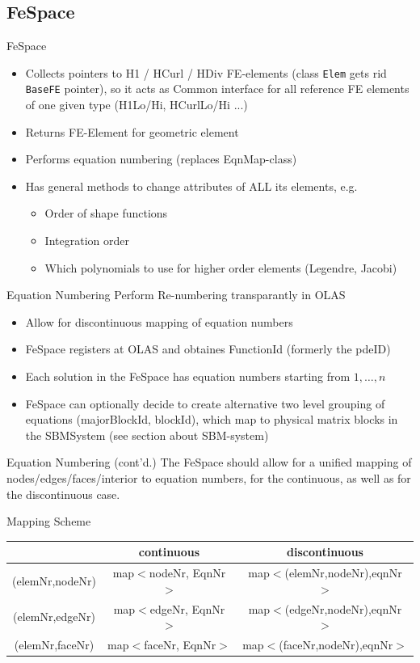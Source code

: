 \documentclass[10pt]{beamer}
\begin{document}
\subsection{FeSpace}
\begin{frame}[fragile]{FeSpace}
\begin{itemize} 
\item Collects pointers to H1 / HCurl / HDiv FE-elements (class \verb#Elem# gets rid \verb#BaseFE# pointer), so it acts as {\color{red} Common interface for all reference FE elements of one given type (H1Lo/Hi, HCurlLo/Hi ...)}
\item Returns FE-Element for geometric element
\item Performs equation numbering (replaces EqnMap-class)
\item Has general methods to change attributes of ALL its elements, e.g.
\begin{itemize}
\item Order of shape functions
\item Integration order
\item Which polynomials to use for higher order elements (Legendre, Jacobi)
\end{itemize}
\end{itemize}
\end{frame}

\begin{frame}[fragile]{Equation Numbering}
Perform Re-numbering transparantly in OLAS 
\begin{itemize}
  \item Allow for discontinuous mapping of equation numbers
  \item FeSpace registers at OLAS and obtaines FunctionId (formerly the pdeID)
  \item Each solution in the FeSpace has equation numbers starting from $1,\dots,n$
  \item FeSpace can optionally decide to create alternative two level grouping of equations (majorBlockId, blockId), which map to physical matrix blocks in the SBMSystem (see section about SBM-system)
 \end{itemize}
\end{frame}


\begin{frame}{Equation Numbering (cont'd.)}
The FeSpace should allow for a unified mapping of nodes/edges/faces/interior to equation numbers, for the continuous, as well as for the discontinuous case.
\begin{block}{Mapping Scheme}
\begin{tabular}{c|c|c}
& continuous & discontinuous \\ \hline
(elemNr,nodeNr) & map$<$nodeNr, EqnNr$>$ & map$<$(elemNr,nodeNr),eqnNr$>$ \\
(elemNr,edgeNr) & map$<$edgeNr, EqnNr$>$ & map$<$(edgeNr,nodeNr),eqnNr$>$ \\
(elemNr,faceNr) & map$<$faceNr, EqnNr$>$ & map$<$(faceNr,nodeNr),eqnNr$>$ \\
\end{tabular}
\end{block}
\end{frame}
\end{document}
